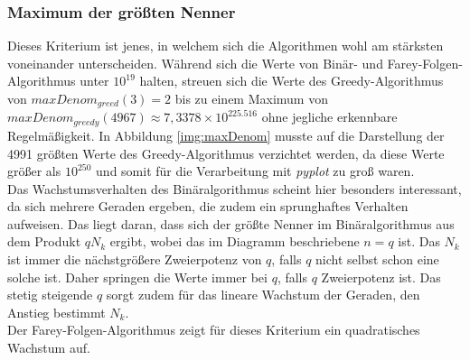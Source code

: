 

\subsubsection{Maximum der größten Nenner}
Dieses Kriterium ist jenes, in welchem sich die Algorithmen wohl am stärksten voneinander unterscheiden. Während sich die Werte von Binär- und Farey-Folgen-Algorithmus unter $10^{19}$ halten, streuen sich die Werte des Greedy-Algorithmus von $maxDenom_{greed}(3) = 2$ bis zu einem Maximum von $maxDenom_{greedy}(4967) \approx 7,3378 \times 10^{225.516}$ ohne jegliche erkennbare Regelmäßigkeit. In Abbildung \ref{img:maxDenom} musste auf die Darstellung der 4991 größten Werte des Greedy-Algorithmus verzichtet werden, da diese Werte größer als $10^{250}$ und somit für die Verarbeitung mit \emph{pyplot} zu groß waren.\\
Das Wachstumsverhalten des Binäralgorithmus scheint hier besonders interessant, da sich mehrere Geraden ergeben, die zudem ein sprunghaftes Verhalten aufweisen. Das liegt daran, dass sich der größte Nenner im Binäralgorithmus aus dem Produkt $qN_k$ ergibt, wobei das im Diagramm beschriebene $n=q$ ist. Das $N_k$ ist immer die nächstgrößere Zweierpotenz von $q$, falls $q$ nicht selbst schon eine solche ist. Daher springen die Werte immer bei $q$, falls $q$ Zweierpotenz ist. Das stetig steigende $q$ sorgt zudem für das lineare Wachstum der Geraden, den Anstieg bestimmt $N_k$.\\
Der Farey-Folgen-Algorithmus zeigt für dieses Kriterium ein quadratisches Wachstum auf.

